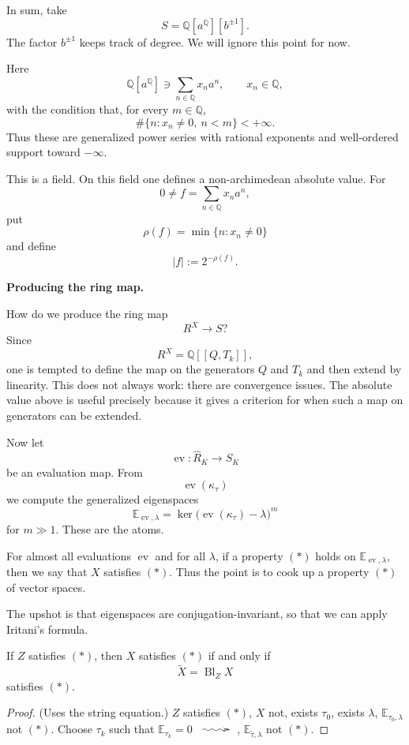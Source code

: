 In sum, take
\[
S=\mathbb{Q}[a^{\mathbb{Q}}]
[b^{\pm 1}].
\]
The factor $b^{\pm 1}$ keeps track of
degree.
We will ignore this point for now.

Here
\[
\mathbb{Q}[a^{\mathbb{Q}}]
\ni
\sum_{n\in\mathbb{Q}} x_n a^n,
\qquad x_n\in\mathbb{Q},
\]
with the condition that, for every
$m\in\mathbb{Q}$,
\[
\#\{n:x_n\neq 0,\ n<m\}<+\infty.
\]
Thus these are generalized power
series with rational exponents and
well-ordered support toward
$-\infty$.

This is a field.
On this field one defines a
non-archimedean absolute value.
For
\[
0\neq f=\sum_{n\in\mathbb{Q}}x_n a^n,
\]
put
\[
\rho(f)=\min\{n:x_n\neq 0\}
\]
and define
\[
|f|:=2^{-\rho(f)}.
\]

\medskip\noindent
{\bf Producing the ring map.}

How do we produce the ring map
\[
R^X\to S?
\]
Since
\[
R^X=\mathbb{Q}[[Q,T_k]],
\]
one is tempted to define the map on
the generators $Q$ and $T_k$ and then
extend by linearity.
This does not always work:
there are convergence issues.
The absolute value above is useful
precisely because it gives a criterion
for when such a map on generators can
be extended.

Now let
\[
\operatorname{ev}:\widehat R_K\to S_K
\]
be an evaluation map.
From
\[
\operatorname{ev}(\kappa_\tau)
\]
we compute the generalized
eigenspaces
\[
\mathbb{E}_{\operatorname{ev},\lambda}
=
\ker
\bigl(
\operatorname{ev}(\kappa_\tau)-\lambda
\bigr)^m
\]
for $m\gg 1$.
These are the atoms.

For almost all evaluations
$\operatorname{ev}$ and for all
$\lambda$, if a property $(*)$ holds
on
$\mathbb{E}_{\operatorname{ev},\lambda}$,
then we say that $X$ satisfies $(*)$.
Thus the point is to cook up a
property $(*)$ of vector spaces.

\begin{remark}
\label{remark-how-to}
The upshot is that eigenspaces
are conjugation-invariant, so that
we can apply Iritani's formula.
\end{remark}

\begin{proposition}
\label{proposition-z-satisfies}
If $Z$ satisfies $(*)$, then $X$
satisfies $(*)$ if and only if
\[
\widetilde X=\operatorname{Bl}_Z X
\]
satisfies $(*)$.
\end{proposition}

\begin{proof}
(Uses the string equation.)
$Z$ satisfies $(*)$, $X$ not,
exists $\tau_0$, exists $\lambda$,
$\mathbb{E}_{\tau_0,\lambda}$ not $(*)$.
Choose $\tau_k$ such that 
$\mathbb{E}_{\tau_k}=0$
$\xymatrix{\ar@{~>}[r]&}$,
$\mathbb{E}_{\tilde{\tau},\lambda}$ not
$(*)$.
\end{proof}

